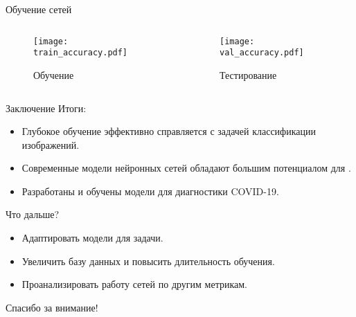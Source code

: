 \documentclass[aspectratio=169]{beamer}
\begin{document}
\begin{frame}{Обучение сетей}
    \begin{columns}[T]
        \begin{column}{.4\paperwidth}
            \begin{figure}
                \centering
                \texttt{[image: train\_accuracy.pdf]} 
                \caption{Обучение}
            \end{figure}            
        \end{column}
        \begin{column}{.4\paperwidth}
            \begin{figure}
                \centering                
                \texttt{[image: val\_accuracy.pdf]}
                \caption{Тестирование}
            \end{figure} 
        \end{column}
    \end{columns}   
\end{frame}
\begin{frame}{Заключение}
    Итоги:\\
    \begin{itemize}
        \item Глубокое обучение эффективно справляется с задачей классификации изображений. 
        \item Современные модели нейронных сетей обладают большим потенциалом для .
        \item Разработаны и обучены модели для диагностики COVID-19.
    \end{itemize}

    \vspace{2em}    
    Что дальше?
    \begin{itemize}
        \item Адаптировать модели для задачи.
        \item Увеличить базу данных и повысить длительность обучения.
        \item Проанализировать работу сетей по другим метрикам.
    \end{itemize}
\end{frame}
\begin{frame}
    \centering\Huge
    Спасибо за внимание!
\end{frame}
\end{document}
